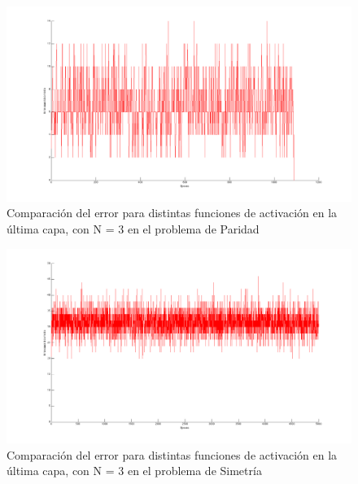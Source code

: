 \documentclass{sig-alternate}
\begin{document}
\begin{figure}[!ht]
	\includegraphics[scale=0.5]{images/par_step_N3_eta02.png}
  \caption{Comparaci\'on del error para distintas funciones de activaci\'on en la \'ultima capa, con N = 3 en el problema de Paridad}
  \label{fig:parN3_STEP}
\end{figure}

\begin{figure}[!ht]
	\includegraphics[scale=0.5]{images/par_step_N5_eta02.png}
  \caption{Comparaci\'on del error para distintas funciones de activaci\'on en la \'ultima capa, con N = 3 en el problema de Simetr\'ia}
  \label{fig:parN5_STEP}
\end{figure}
\end{document}
